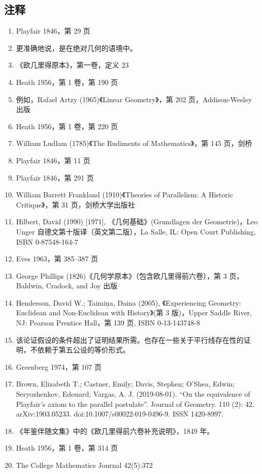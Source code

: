 \subsection{注释}
\begin{enumerate}
\item Playfair 1846，第 29 页
\item 更准确地说，是在绝对几何的语境中。
\item 《欧几里得原本》，第一卷，定义 23
\item Heath 1956，第 1 卷，第 190 页
\item 例如，Rafael Artzy (1965)《Linear Geometry》，第 202 页，Addison-Wesley 出版
\item Heath 1956，第 1 卷，第 220 页
\item William Ludlam (1785)《The Rudiments of Mathematics》，第 145 页，剑桥
\item Playfair 1846，第 11 页
\item Playfair 1846，第 291 页
\item William Barrett Frankland (1910)《Theories of Parallelism: A Historic Critique》，第 31 页，剑桥大学出版社
\item Hilbert, David (1990) [1971], 《几何基础》(Grundlagen der Geometrie)，Leo Unger 自德文第十版译（英文第二版），La Salle, IL: Open Court Publishing, ISBN 0-87548-164-7
\item Eves 1963，第 385–387 页
\item George Phillips (1826)《几何学原本》（包含欧几里得前六卷），第 3 页，Baldwin, Cradock, and Joy 出版
\item Henderson, David W.; Taimiņa, Daina (2005), 《Experiencing Geometry: Euclidean and Non-Euclidean with History》(第 3 版)，Upper Saddle River, NJ: Pearson Prentice Hall，第 139 页, ISBN 0-13-143748-8
\item 该论证假设的条件超出了证明结果所需。也存在一些关于平行线存在性的证明，不依赖于第五公设的等价形式。
\item Greenberg 1974，第 107 页
\item Brown, Elizabeth T.; Castner, Emily; Davis, Stephen; O’Shea, Edwin; Seryozhenkov, Edouard; Vargas, A. J. (2019-08-01). “On the equivalence of Playfair's axiom to the parallel postulate”. Journal of Geometry. 110 (2): 42. arXiv:1903.05233. doi:10.1007/s00022-019-0496-9. ISSN 1420-8997.
\item 《年鉴伴随文集》中的《欧几里得前六卷补充说明》，1849 年。
\item Heath 1956，第 1 卷，第 314 页
\item The College Mathematics Journal 42(5):372
\end{enumerate}
